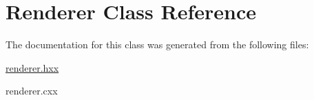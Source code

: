 \hypertarget{classRenderer}{\section{Renderer Class Reference}
\label{classRenderer}
}


The documentation for this class was generated from the following files\-:\begin{DoxyCompactItemize}
\item 
\hyperlink{renderer_8hxx}{renderer.\-hxx}\item 
renderer.\-cxx\end{DoxyCompactItemize}
